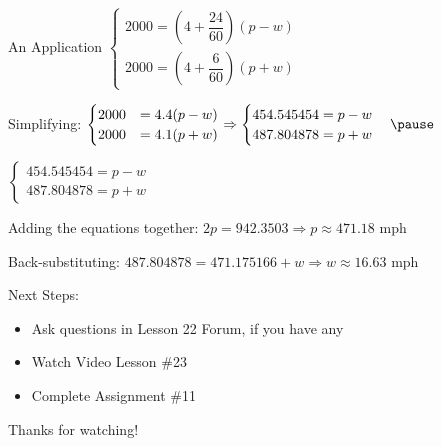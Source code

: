 \documentclass[t, aspectratio=169]{beamer}
\newcommand{\fp}[1]{\left({#1}\right)} %
\def\then{\Rightarrow}
\begin{document}
	\begin{frame}{An Application}
		$\begin{cases}
		2000 = \fp{4 + \dfrac{24}{60}}\fp{p - w} \\
		2000 = \fp{4 + \dfrac{6}{60}}\fp{p + w}
		\end{cases}$ \pause
		
		Simplifying: $\begin{cases}
		2000 &= 4.4(p-w) \\
		2000 &= 4.1(p+w)
		\end{cases} \then \begin{cases}
			454.545454 = p - w \\
			487.804878 = p + w
		\end{cases} \pause$
		
		$\begin{cases}
		454.545454 = p - w \\
		487.804878 = p + w
		\end{cases}$ \pause
		
		Adding the equations together: $2p = 942.3503 \then p \approx 471.18$ mph \pause
		
		Back-substituting: $487.804878 = 471.175166 + w \then w \approx 16.63$ mph
	\end{frame}

	\begin{frame}{Next Steps:}
		\begin{itemize}
			\item Ask questions in Lesson 22 Forum, if you have any
			\item Watch Video Lesson \#23
			\item Complete Assignment \#11
		\end{itemize}
	
		\vfill
		
		Thanks for watching!
	\end{frame}
	
\end{document}
